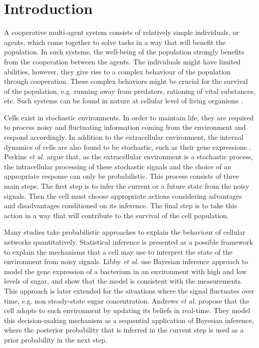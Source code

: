\chapter{Introduction}
A cooperative multi-agent system consists of relatively simple individuals, or agents, which come together to solve tasks in a way that will benefit the population. In such systems, the well-being of the population strongly benefits from the cooperation between the agents. The individuals might have limited abilities, however, they give rise to a complex behaviour of the population through cooperation. These complex behaviors might be crucial for the survival of the population, e.g. running away from predators, rationing of vital substances, etc. Such systems can be found in nature at cellular level of living organisms \cite{Perkins2009a}. \par
Cells exist in stochastic environments. In order to maintain life, they are required to process noisy and fluctuating information coming from the environment and respond accordingly. In addition to the extracellular environment, the internal dynamics of cells are also found to be stochastic, such as their gene expressions \cite{Shahrezaei2008}. Perkins \textit{et al.} \cite{Perkins2009a} argue that, as the extracellular environment is a stochastic process, the intracellular processing of these stochastic signals and the choice of an appropriate response can only be probabilistic. This process consists of three main steps. The first step is to infer the current or a future state from the noisy signals. Then the cell must choose appropriate actions considering advantages and disadvantages conditioned on its inference. The final step is to take this action in a way that will contribute to the survival of the cell population. \par
Many studies take probabilistic approaches to explain the behaviour of cellular networks quantitatively. Statistical inference is presented as a possible framework to explain the mechanisms that a cell may use to interpret the state of the environment from noisy signals. Libby \textit{et al.} \cite{Libby2007} use Bayesian inference approach to model the gene expression of a bacterium in an environment with high and low levels of sugar, and show that the model is consistent with the measurements. This approach is later extended for the situations where the signal fluctuates over time, e.g. non steady-state sugar concentration. Andrews \textit{et al.} \cite{Andrews2006} propose that the cell adopts to such environment by updating its beliefs in real-time. They model this decision-making mechanism as a sequential application of Bayesian inference, where the posterior probability that is inferred in the current step is used as a prior probability in the next step.\par
